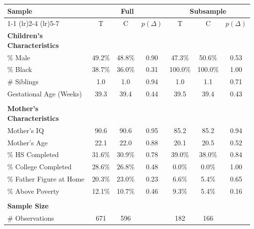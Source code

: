 \begin{tabular}{lcccccc}
\toprule 
\midrule 
Sample & \multicolumn{3}{c}{Full} & \multicolumn{3}{c}{Subsample} \\
 \cmidrule(lr){1-1} \cmidrule(lr){2-4} \cmidrule(lr){5-7} 
 & T & C & $p(\Delta)$ & T & C & $p(\Delta)$ \\
\midrule 
\textbf{Children's Characteristics} \\
\quad \% Male & 49.2\% & 48.8\% & 0.90 & 47.3\% & 50.6\% & 0.53 \\
\quad \% Black & 38.7\% & 36.0\% & 0.31 & 100.0\% & 100.0\% & 1.00 \\
\quad \# Siblings & 1.0 & 1.0 & 0.94 & 1.0 & 1.1 & 0.71 \\
\quad Gestational Age (Weeks) & 39.3 & 39.4 & 0.44 & 39.5 & 39.4 & 0.43 \\
 \\
\textbf{Mother's Characteristics} \\
\quad Mother's IQ & 90.6 & 90.6 & 0.95 & 85.2 & 85.2 & 0.94 \\
\quad Mother's Age & 22.1 & 22.0 & 0.88 & 20.1 & 20.5 & 0.52 \\
\quad \% HS Completed & 31.6\% & 30.9\% & 0.78 & 39.0\% & 38.0\% & 0.84 \\
\quad \% College Completed & 28.6\% & 26.8\% & 0.48 & 0.0\% & 0.0\% & 1.00 \\
\quad \% Father Figure at Home & 20.3\% & 23.0\% & 0.23 & 6.6\% & 5.4\% & 0.65 \\
\quad \% Above Poverty & 12.1\% & 10.7\% & 0.46 & 9.3\% & 5.4\% & 0.16 \\
 \\
\textbf{Sample Size} \\
\quad \# Observations & 671 & 596 &  & 182 & 166 &  \\
\midrule 
\bottomrule 
\end{tabular}
